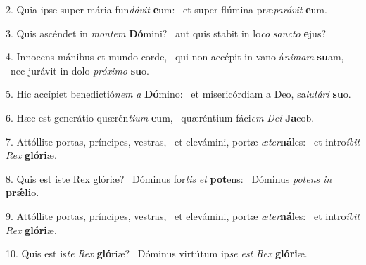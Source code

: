 2. Quia ipse super mária fun\textit{dá}\textit{vit} \textbf{e}um: \ast\  et super flúmina præ\textit{pa}\textit{rá}\textit{vit} \textbf{e}um.\

3. Quis ascéndet in \textit{mon}\textit{tem} \textbf{Dó}mini? \ast\  aut quis stabit in lo\textit{co} \textit{sanc}\textit{to} \textbf{e}jus?\

4. Innocens mánibus et mundo corde, \dag\  qui non accépit in vano á\textit{ni}\textit{mam} \textbf{su}am, \ast\  nec jurávit in dolo \textit{pró}\textit{xi}\textit{mo} \textbf{su}o.\

5. Hic accípiet benedictió\textit{nem} \textit{a} \textbf{Dó}mino: \ast\  et misericórdiam a Deo, sa\textit{lu}\textit{tá}\textit{ri} \textbf{su}o.\

6. Hæc est generátio quærén\textit{ti}\textit{um} \textbf{e}um, \ast\  quæréntium fáci\textit{em} \textit{De}\textit{i} \textbf{Ja}cob.\

7. Attóllite portas, príncipes, vestras, \dag\  et elevámini, portæ \textit{æ}\textit{ter}\textbf{ná}les: \ast\  et intro\textit{í}\textit{bit} \textit{Rex} \textbf{gló}\textbf{ri}æ.\

8. Quis est iste Rex glóriæ? \dag\  Dóminus for\textit{tis} \textit{et} \textbf{pot}ens: \ast\  Dóminus \textit{pot}\textit{ens} \textit{in} \textbf{prǽ}\textbf{li}o.\

9. Attóllite portas, príncipes, vestras, \dag\  et elevámini, portæ \textit{æ}\textit{ter}\textbf{ná}les: \ast\  et intro\textit{í}\textit{bit} \textit{Rex} \textbf{gló}\textbf{ri}æ.\

10. Quis est is\textit{te} \textit{Rex} \textbf{gló}riæ? \ast\  Dóminus virtútum ip\textit{se} \textit{est} \textit{Rex} \textbf{gló}\textbf{ri}æ.\

